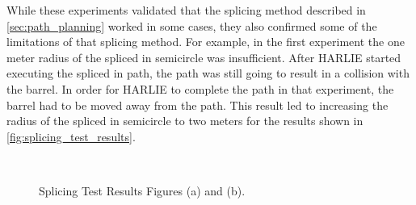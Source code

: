 While these experiments validated that the splicing method described in \autoref{sec:path_planning} worked in some cases, they also confirmed some of the limitations of that splicing method. For example, in the first experiment the one meter radius of the spliced in semicircle was insufficient. After HARLIE started executing the spliced in path, the path was still going to result in a collision with the barrel. In order for HARLIE to complete the path in that experiment, the barrel had to be moved away from the path. This result led to increasing the radius of the spliced in semicircle to two meters for the results shown in \autoref{fig:splicing_test_results}.

\begin{figure}
\centering
{}
\\
\caption[Splicing Test Results Figures (a) and (b)]{Splicing Test Results  Figures (a) and (b).}
\end{figure}

